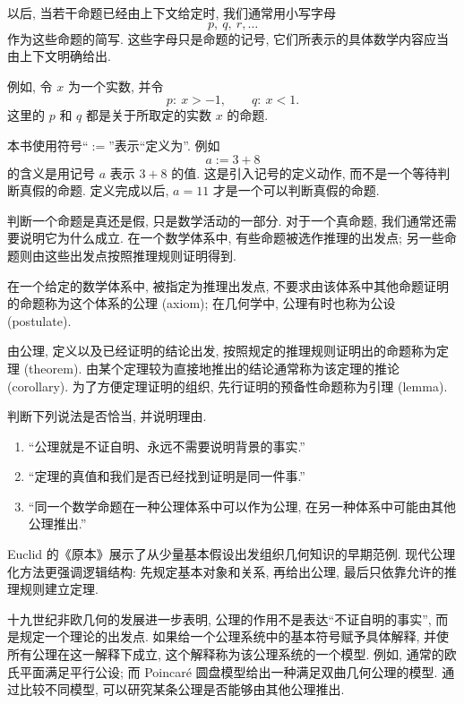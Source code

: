 \documentclass[usesamecnt, thmcnt=section, lang=cn, newtx, 10pt, scheme=chinese]{elegantbook}
\begin{document}
\begin{notation}
以后, 当若干命题已经由上下文给定时, 我们通常用小写字母
\[
 p,\ q,\ r,\ldots
\]
作为这些命题的简写. 这些字母只是命题的记号, 它们所表示的具体数学内容应当由上下文明确给出.

例如, 令 $x$ 为一个实数, 并令
\[
 p:\ x>-1,\qquad q:\ x<1.
\]
这里的 $p$ 和 $q$ 都是关于所取定的实数 $x$ 的命题.
\end{notation}

\begin{notation}
本书使用符号``$:=$''表示``定义为''. 例如
\[
 a:=3+8
\]
的含义是用记号 $a$ 表示 $3+8$ 的值. 这是引入记号的定义动作, 而不是一个等待判断真假的命题. 定义完成以后, $a=11$ 才是一个可以判断真假的命题.
\end{notation}

判断一个命题是真还是假, 只是数学活动的一部分. 对于一个真命题, 我们通常还需要说明它为什么成立. 在一个数学体系中, 有些命题被选作推理的出发点; 另一些命题则由这些出发点按照推理规则证明得到.

\begin{definition}
在一个给定的数学体系中, 被指定为推理出发点, 不要求由该体系中其他命题证明的命题称为这个体系的{\color{blue}公理 (axiom)}; 在几何学中, 公理有时也称为{\color{blue}公设 (postulate)}.

由公理, 定义以及已经证明的结论出发, 按照规定的推理规则证明出的命题称为{\color{blue}定理 (theorem)}. 由某个定理较为直接地推出的结论通常称为该定理的{\color{blue}推论 (corollary)}. 为了方便定理证明的组织, 先行证明的预备性命题称为{\color{blue}引理 (lemma)}.
\end{definition}

\begin{exercise}
\label{ex:logic-02}
判断下列说法是否恰当, 并说明理由.
\begin{enumerate}[label=\rm(\arabic*)]
  \item ``公理就是不证自明、永远不需要说明背景的事实.''
  \item ``定理的真值和我们是否已经找到证明是同一件事.''
  \item ``同一个数学命题在一种公理体系中可以作为公理, 在另一种体系中可能由其他公理推出.''
\end{enumerate}
\end{exercise}

\begin{knowledge}[公理化方法与模型]
Euclid 的《原本》展示了从少量基本假设出发组织几何知识的早期范例. 现代公理化方法更强调逻辑结构: 先规定基本对象和关系, 再给出公理, 最后只依靠允许的推理规则建立定理.

十九世纪非欧几何的发展进一步表明, 公理的作用不是表达``不证自明的事实'', 而是规定一个理论的出发点. 如果给一个公理系统中的基本符号赋予具体解释, 并使所有公理在这一解释下成立, 这个解释称为该公理系统的一个模型. 例如, 通常的欧氏平面满足平行公设; 而 Poincaré 圆盘模型给出一种满足双曲几何公理的模型. 通过比较不同模型, 可以研究某条公理是否能够由其他公理推出.
\end{knowledge}
\end{document}
